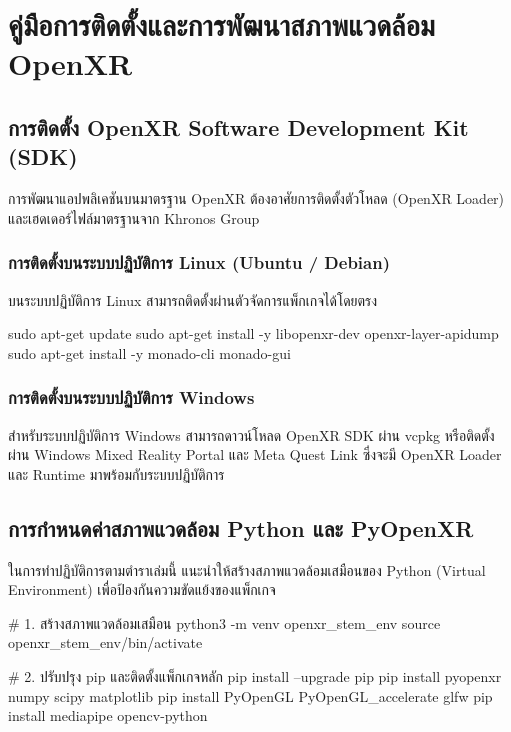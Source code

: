 \chapter{คู่มือการติดตั้งและการพัฒนาสภาพแวดล้อม OpenXR}
\label{chap:appendix_a}

\section{การติดตั้ง OpenXR Software Development Kit (SDK)}

การพัฒนาแอปพลิเคชันบนมาตรฐาน OpenXR ต้องอาศัยการติดตั้งตัวโหลด (OpenXR Loader) และเฮดเดอร์ไฟล์มาตรฐานจาก Khronos Group

\subsection{การติดตั้งบนระบบปฏิบัติการ Linux (Ubuntu / Debian)}
บนระบบปฏิบัติการ Linux สามารถติดตั้งผ่านตัวจัดการแพ็กเกจได้โดยตรง
\begin{codebox}
sudo apt-get update
sudo apt-get install -y libopenxr-dev openxr-layer-apidump
sudo apt-get install -y monado-cli monado-gui
\end{codebox}

\subsection{การติดตั้งบนระบบปฏิบัติการ Windows}
สำหรับระบบปฏิบัติการ Windows สามารถดาวน์โหลด OpenXR SDK ผ่าน vcpkg หรือติดตั้งผ่าน Windows Mixed Reality Portal และ Meta Quest Link ซึ่งจะมี OpenXR Loader และ Runtime มาพร้อมกับระบบปฏิบัติการ

\section{การกำหนดค่าสภาพแวดล้อม Python และ PyOpenXR}

ในการทำปฏิบัติการตามตำราเล่มนี้ แนะนำให้สร้างสภาพแวดล้อมเสมือนของ Python (Virtual Environment) เพื่อป้องกันความขัดแย้งของแพ็กเกจ

\begin{codebox}
# 1. สร้างสภาพแวดล้อมเสมือน
python3 -m venv openxr_stem_env
source openxr_stem_env/bin/activate

# 2. ปรับปรุง pip และติดตั้งแพ็กเกจหลัก
pip install --upgrade pip
pip install pyopenxr numpy scipy matplotlib
pip install PyOpenGL PyOpenGL_accelerate glfw
pip install mediapipe opencv-python
\end{codebox}

